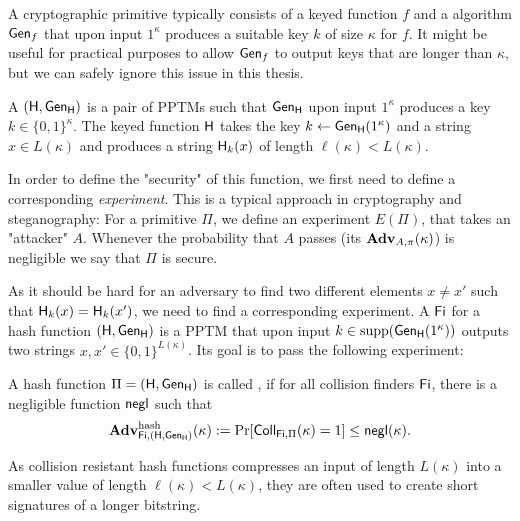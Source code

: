 A cryptographic primitive typically consists of a keyed function $f$ and
a  algorithm $\operatorname{\mathsf{Gen}}_{f}$ that upon input $1^{\kappa}$
produces a suitable key $k$ of size $\kappa$ for
$f$. It might be useful for practical purposes to allow $\operatorname{\mathsf{Gen}}_{f}$ to
output keys that are longer than $\kappa$, but we can safely ignore this
issue in this thesis.

A  $(\operatorname{\mathsf{H}},\operatorname{\mathsf{Gen}}_{\operatorname{\mathsf{H}}})$ is a pair of \acp{PPTM} such that
$\operatorname{\mathsf{Gen}}_{\operatorname{\mathsf{H}}}$ upon input $1^{\kappa}$ produces a key $k\in
\{0,1\}^{\kappa}$. The keyed function $\operatorname{\mathsf{H}}$ takes the key $k\gets
\operatorname{\mathsf{Gen}}_{\operatorname{\mathsf{H}}}(1^{\kappa})$ and a string $x\in L(\kappa)$ and produces a
string $\operatorname{\mathsf{H}}_{k}(x)$ of length $\ell(\kappa) < L(\kappa)$.

 In order to define the
"security" of this function, we first need to define a corresponding
\emph{experiment}. This is a typical approach in cryptography and
steganography: For a primitive $\Pi$, we define an experiment $E(\Pi)$,
that takes an "attacker" $A$. Whenever the probability that $A$ passes
(its  $\operatorname{\mathbf{Adv}}_{A,\pi}(\kappa)$) 
is negligible we say that $\Pi$ is secure. 

As it should be hard for an
adversary to find two different elements $x\neq x'$ such that
$\operatorname{\mathsf{H}}_{k}(x)=\operatorname{\mathsf{H}}_{k}(x')$, we need to find a corresponding experiment. A
 $\operatorname{\mathsf{Fi}}$ for a hash function $(\operatorname{\mathsf{H}},\operatorname{\mathsf{Gen}}_{\operatorname{\mathsf{H}}})$
 is a \ac{PPTM} that upon input 
$k\in \operatorname{supp}(\operatorname{\mathsf{Gen}}_{\operatorname{\mathsf{H}}}(1^{\kappa}))$ outputs two strings
$x,x'\in \{0,1\}^{L(\kappa)}$. Its goal is to pass the following
experiment:

A hash function $\Pi=(\operatorname{\mathsf{H}},\operatorname{\mathsf{Gen}}_{\operatorname{\mathsf{H}}})$ is called
, if for all collision finders $\operatorname{\mathsf{Fi}}$, there is a
negligible function $\operatorname{\mathsf{negl}}$ such that
\begin{align*}
 \operatorname{\mathbf{Adv}}_{\operatorname{\mathsf{Fi}},(\operatorname{\mathsf{H}},\operatorname{\mathsf{Gen}}_{\operatorname{\mathsf{H}}})}^{\operatorname{hash}}(\kappa) := \Pr[\operatorname{\mathsf{Coll}}_{\operatorname{\mathsf{Fi}},\Pi}(\kappa)=1]\leq \operatorname{\mathsf{negl}}(\kappa).
\end{align*}

As collision resistant hash functions compresses an input of length
$L(\kappa)$ into a smaller value of length $\ell(\kappa) < L(\kappa)$, they
are often used to create short signatures of a longer bitstring.

